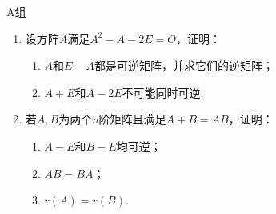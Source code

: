 \centerline{\heiti A组}
\begin{enumerate}
    \item 设方阵$A$满足$A^2-A-2E=O$，证明：
          \begin{enumerate}
              \item $A$和$E-A$都是可逆矩阵，并求它们的逆矩阵；

              \item $A+E$和$A-2E$不可能同时可逆.
          \end{enumerate}

    \item 若$A,B$为两个$n$阶矩阵且满足$A+B=AB$，证明：
          \begin{enumerate}
              \item $A-E$和$B-E$均可逆；

              \item $AB=BA$；

              \item $r(A)=r(B)$.
          \end{enumerate}
\end{enumerate}

